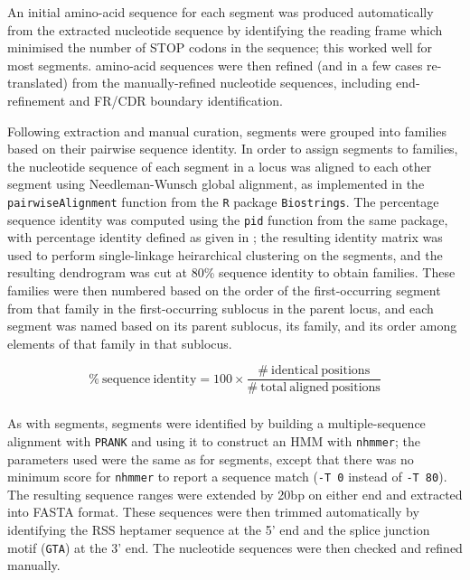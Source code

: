 An initial amino-acid sequence for each \vh segment was produced automatically from the extracted nucleotide sequence by identifying the reading frame which minimised the number of STOP codons in the sequence; this worked well for most segments. \vh amino-acid sequences were then refined (and in a few cases re-translated) from the manually-refined nucleotide sequences, including end-refinement and FR/CDR boundary identification.

Following extraction and manual curation, \vh segments were grouped into families based on their pairwise sequence identity. In order to assign segments to families, the nucleotide sequence of each \vh segment in a locus was aligned to each other segment using Needleman-Wunsch global alignment, as implemented in the \lstinline{pairwiseAlignment} function from the \lstinline{R} package \lstinline{Biostrings}. The percentage sequence identity was computed using the \lstinline{pid} function from the same package, with percentage identity defined as given in ; the resulting identity matrix was used to perform single-linkage heirarchical clustering on the \vh segments, and the resulting dendrogram was cut at 80\% sequence identity to obtain \vh families. These families were then numbered based on the order of the first-occurring \vh segment from that family in the first-occurring sublocus in the parent locus, and each \vh segment was named based on its parent sublocus, its family, and its order among elements of that family in that sublocus. %

\begin{equation}
\mathrm{\%~sequence~identity} = 100 \times \frac{\mathrm{\#~identical~positions}}{\mathrm{\#~total~aligned~positions}}
\label{eq:pid}
\end{equation}

\subsubsection{\jh}

As with \vh segments, \jh segments were identified by building a multiple-sequence alignment with \texttt{PRANK} and using it to construct an HMM with \lstinline{nhmmer}; the parameters used were the same as for \vh segments, except that there was no minimum score for \lstinline{nhmmer} to report a sequence match (\lstinline{-T 0} instead of \lstinline{-T 80}). The resulting sequence ranges were extended by 20bp on either end and extracted into FASTA format. These sequences were then trimmed automatically by identifying the RSS heptamer sequence at the 5' end and the splice junction motif (\texttt{GTA}) at the 3' end. The \jh nucleotide sequences were then checked and refined manually.

